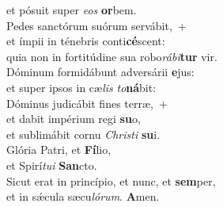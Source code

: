 \oddverse et pósuit super \textit{e}\textit{os} \textbf{or}bem.\\
\evenverse Pedes sanctórum suórum servábit,~+\\
\evenverse  et ímpii in ténebris conti\textbf{cé}scent:~\*\\
\evenverse quia non in fortitúdine sua robo\textit{rá}\textit{bi}\textbf{tur} vir.\\
\oddverse Dóminum formidábunt adversárii \textbf{e}jus:~\*\\
\oddverse et super ipsos in cæ\textit{lis} \textit{to}\textbf{ná}bit:\\
\evenverse Dóminus judicábit fines terræ,~+\\
\evenverse  et dabit impérium regi \textbf{su}o,~\*\\
\evenverse et sublimábit cornu \textit{Chri}\textit{sti} \textbf{su}i.\\
\oddverse Glória Patri, et \textbf{Fí}lio,~\*\\
\oddverse et Spirí\textit{tu}\textit{i} \textbf{San}cto.\\
\evenverse Sicut erat in princípio, et nunc, et \textbf{sem}per,~\*\\
\evenverse et in sǽcula sæcu\textit{ló}\textit{rum}. \textbf{A}men.\\
